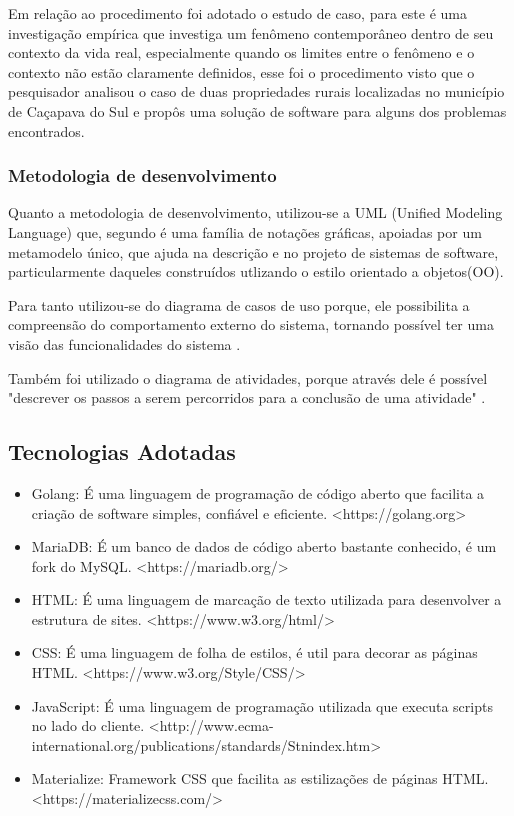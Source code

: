 \documentclass[12pt]{article}
\begin{document}
Em relação ao procedimento foi adotado o estudo de caso, para  este é uma investigação empírica que investiga um fenômeno contemporâneo dentro de seu contexto da vida real, especialmente quando os limites entre o fenômeno e o contexto não estão claramente definidos, esse foi o procedimento visto que o pesquisador analisou o caso de duas propriedades rurais localizadas no município de Caçapava do Sul e propôs uma solução de software para alguns dos problemas encontrados.

\subsubsection{Metodologia de desenvolvimento}

Quanto a metodologia de desenvolvimento, utilizou-se a UML (Unified Modeling Language) que, segundo  é uma família de notações gráficas, apoiadas por um metamodelo único, que ajuda na descrição e no projeto de sistemas de software, particularmente daqueles construídos utlizando o estilo orientado a objetos(OO).

Para tanto utilizou-se do diagrama de casos de uso porque, ele possibilita a compreensão do comportamento externo do sistema, tornando possível ter uma visão das funcionalidades do sistema \cite{guedes18}.

Também foi utilizado o diagrama de atividades, porque através dele é possível "descrever os passos a serem percorridos para a conclusão de uma atividade" \cite{guedes18}.

\subsection{Tecnologias Adotadas}

\begin{itemize}
	\item Golang: É uma linguagem de programação de código aberto que facilita a criação de software simples, confiável e eficiente. <https://golang.org>	
	\item MariaDB: É um banco de dados de código aberto bastante conhecido, é um fork do MySQL. <https://mariadb.org/>
	\item HTML: É uma linguagem de marcação de texto utilizada para desenvolver a estrutura de sites. <https://www.w3.org/html/>
	\item CSS: É uma linguagem de folha de estilos, é util para decorar as páginas HTML. 
<https://www.w3.org/Style/CSS/>
	\item JavaScript: É uma linguagem de programação utilizada que executa scripts no lado do cliente. 
<http://www.ecma-international.org/publications/standards/Stnindex.htm>
	\item Materialize: Framework CSS que facilita as estilizações de páginas HTML. <https://materializecss.com/>
\end{itemize}
\end{document}
